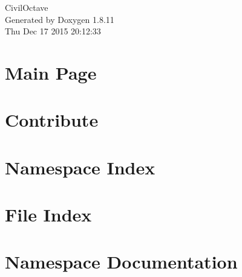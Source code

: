 \documentclass[twoside]{book}
\newcommand{\+}{\discretionary{\mbox{\scriptsize$\hookleftarrow$}}{}{}}
\newcommand{\clearemptydoublepage}{%
  \newpage{\pagestyle{empty}\cleardoublepage}%
}
\begin{document}
\hypersetup{pageanchor=false,
             bookmarks=true,
             bookmarksnumbered=true,
             pdfencoding=unicode
            }
\begin{titlepage}
\vspace*{7cm}
\begin{center}%
{\Large Civil\+Octave }\\
\vspace*{1cm}
{\large Generated by Doxygen 1.8.11}\\
\vspace*{0.5cm}
{\small Thu Dec 17 2015 20:12:33}\\
\end{center}
\end{titlepage}
\clearemptydoublepage
\tableofcontents
\clearemptydoublepage
{}
\hypersetup{pageanchor=true}

\chapter{Main Page}
\label{index}\hypertarget{index}{}
\chapter{Contribute}
\label{md__home_amarjeet_projects_CivilOctave_sage_Contribute}
\hypertarget{md__home_amarjeet_projects_CivilOctave_sage_Contribute}{}

\chapter{Namespace Index}

\chapter{File Index}

\chapter{Namespace Documentation}












\end{document}
